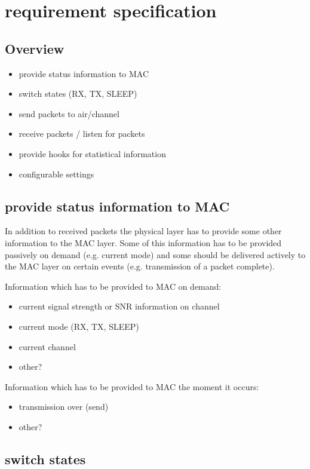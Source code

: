 \section{requirement specification}

\subsection{Overview}

\begin{itemize}
 \item provide status information to MAC
 \item switch states (RX, TX, SLEEP)
 \item send packets to air/channel
 \item receive packets / listen for packets
 \item provide hooks for statistical information
 \item configurable settings
\end{itemize}

\subsection{provide status information to MAC}

In addition to received packets the physical layer has to provide some other information
to the MAC layer.
Some of this information has to be provided passively on demand (e.g. current mode) and some should
be delivered actively to the MAC layer on certain events (e.g. transmission of a packet complete).

\noindent Information which has to be provided to MAC on demand:
\begin{itemize}
 \item current signal strength or SNR information on channel
 \item current mode (RX, TX, SLEEP)
 \item current channel
 \item other?
\end{itemize}

\noindent Information which has to be provided to MAC the moment it occurs:
\begin{itemize}
 \item transmission over (send)
 \item other?
\end{itemize}

\pagebreak
\subsection{switch states}


